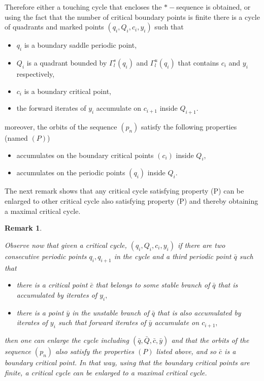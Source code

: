 \documentclass[a4paper,11pt]{article}
\newtheorem{remark}[lemma]{Remark}
\theoremstyle{definition}
\begin{document}
Therefore either  a touching cycle that encloses the $*-$sequence is obtained, or using the fact that the number of critical boundary points is finite there is a cycle of quadrants and marked points $(q_i, Q_i, c_i, y_i)$ such that  
\begin{itemize}
\item[--] $q_i$ is a boundary saddle periodic point,

\item[--] $Q_i$ is a  quadrant bounded by $\Gamma^s_l(q_i)$ and $\Gamma^u_l(q_i)$ that contains $c_i$ and $y_i$ respectively,

\item[--]  $c_i$ is a boundary critical point,

\item[--] the  forward  iterates of $y_i$ accumulate  on $c_{i+1}$ inside $Q_{i+1}$.

    
\end{itemize}
moreover,  the orbits of the sequence $(p_n)$ satisfy the following properties (named $(P)$)
 \begin{itemize}
\item[--] accumulates on the boundary critical points $(c_i)$ inside $Q_i$,

\item[--] accumulates on the periodic points $(q_i)$ inside $Q_i$.


    
\end{itemize}
 
The next remark shows that any critical cycle satisfying property (P) can be enlarged to other critical cycle also satisfying property (P) and thereby obtaining a maximal critical cycle.

\begin{remark}\label{enlarging}
    
Observe now that given a critical cycle, $(q_i, Q_i,c_i, y_i)$ if there are two consecutive periodic points  $q_i, q_{i+1}$ in the cycle and a third periodic point $\bar q$ such that 

\begin{itemize}
    \item[--] there is a critical point $\bar c$ that belongs to some stable branch of $\bar q$ that  is  accumulated by iterates of $y_i,$

    \item[--] there is a point $\bar y$ in the unstable branch of $\bar q$ that is also accumulated by iterates of $y_i$ such that forward iterates of $\bar y$ accumulate on $c_{i+1},$


\end{itemize}

 then   one can enlarge the cycle including  $(\bar q, \bar Q, \bar c, \bar y)$ and that the orbits of the sequence $(p_n)$ also satisfy the properties  $(P)$ listed above, and so  $\bar c $ is a boundary critical point. In that way, using that the boundary critical points are finite,  a critical cycle can be enlarged to a {\it 
 maximal critical cycle}.
 \end{remark}
\end{document}
